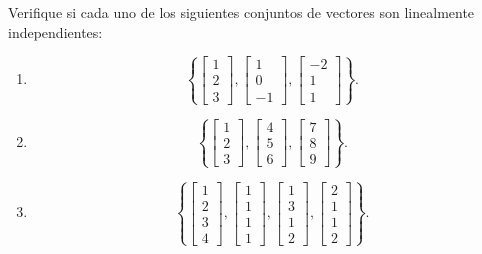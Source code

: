 Verifique si cada uno de los siguientes conjuntos de vectores son linealmente independientes:

\begin{enumerate}[label=\alph*)] %
    \item 

    \[
    \left\{ 
    \begin{bmatrix}
    1 \\ 
    2 \\ 
    3
    \end{bmatrix}
    ,
    \begin{bmatrix}
    1 \\ 
    0 \\ 
    -1
    \end{bmatrix}
    ,
    \begin{bmatrix}
    -2 \\ 
    1 \\ 
    1
    \end{bmatrix} \right\}.
    \]

    \item 
    
    \[
    \left\{ 
    \begin{bmatrix}
    1 \\ 
    2 \\ 
    3
    \end{bmatrix}
    ,
    \begin{bmatrix}
    4 \\ 
    5 \\ 
    6
    \end{bmatrix}
    ,
    \begin{bmatrix}
    7 \\ 
    8 \\ 
    9
    \end{bmatrix} \right\}.
    \]

    \item

    \[
    \left\{ 
    \begin{bmatrix}
    1 \\ 
    2 \\ 
    3 \\
    4
    \end{bmatrix}
    ,
    \begin{bmatrix}
    1 \\ 
    1 \\ 
    1 \\
    1
    \end{bmatrix}
    ,
    \begin{bmatrix}
    1 \\ 
    3 \\ 
    1 \\
    2
    \end{bmatrix}
    ,
    \begin{bmatrix}
    2 \\ 
    1 \\ 
    1 \\
    2
    \end{bmatrix} \right\}.
    \]


\end{enumerate}
